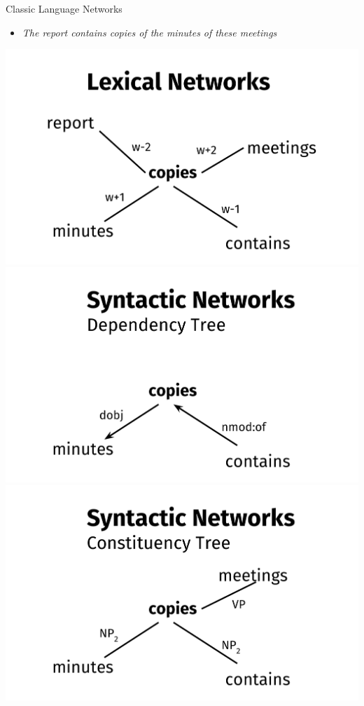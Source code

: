 \documentclass[10pt,xcolor=table]{beamer}
\begin{document}
\begin{frame}{Classic Language Networks}

\begin{itemize}
\item[] \textit{The report contains copies of the minutes of these meetings} 
\end{itemize}

\begin{overprint}
	  \centering
	  
	  \includegraphics[width=.7\linewidth]{image2/Chapitre2/lexi_network_ex.pdf}
	  \\ \cite{2008.Klapaftis.WSIUsingCollocations}
	  \centering
	  \includegraphics[width=.7\linewidth]{image2/Chapitre2/deps_network_ex.pdf} 
	  \centering
	  \includegraphics[width=.7\linewidth]{image2/Chapitre2/consti_network_ex.pdf}   

\end{overprint}
\end{frame}
\end{document}
